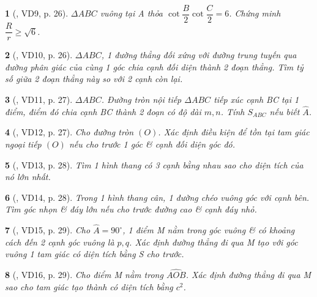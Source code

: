 \documentclass{article}
\newtheorem{baitoan}{}
\begin{document}
\begin{baitoan}[\cite{Hai_Hung_Thu_Tung2022_tap_1}, VD9, p. 26]
	$\Delta ABC$ vuông tại A thỏa $\cot\dfrac{B}{2}\cot\dfrac{C}{2} = 6$. Chứng minh $\dfrac{R}{r}\ge\sqrt{6}$.
\end{baitoan}

\begin{baitoan}[\cite{Hai_Hung_Thu_Tung2022_tap_1}, VD10, p. 26]
	$\Delta ABC$, 1 đường thẳng đối xứng với đường trung tuyến qua đường phân giác của cùng 1 góc chia cạnh đối diện thành 2 đoạn thẳng. Tìm tỷ số giữa 2 đoạn thẳng này so với 2 cạnh còn lại.
\end{baitoan}

\begin{baitoan}[\cite{Hai_Hung_Thu_Tung2022_tap_1}, VD11, p. 27]
	$\Delta ABC$. Đường tròn nội tiếp $\Delta ABC$ tiếp xúc cạnh BC tại 1 điểm, điểm đó chia cạnh BC thành 2 đoạn có độ dài $m,n$. Tính $S_{ABC}$ nếu biết $\widehat{A}$.
\end{baitoan}

\begin{baitoan}[\cite{Hai_Hung_Thu_Tung2022_tap_1}, VD12, p. 27]
	Cho đường tròn $(O)$. Xác định điều kiện để tồn tại tam giác ngoại tiếp $(O)$ nếu cho trước 1 góc \& cạnh đối diện góc đó.
\end{baitoan}

\begin{baitoan}[\cite{Hai_Hung_Thu_Tung2022_tap_1}, VD13, p. 28]
	Tìm 1 hình thang có 3 cạnh bằng nhau sao cho diện tích của nó lớn nhất.
\end{baitoan}

\begin{baitoan}[\cite{Hai_Hung_Thu_Tung2022_tap_1}, VD14, p. 28]
	Trong 1 hình thang cân, 1 đường chéo vuông góc với cạnh bên. Tìm góc nhọn \& đáy lớn nếu cho trước đường cao \& cạnh đáy nhỏ.
\end{baitoan}

\begin{baitoan}[\cite{Hai_Hung_Thu_Tung2022_tap_1}, VD15, p. 29]
	Cho $\widehat{A} = 90^\circ$, 1 điểm M nằm trong góc vuông \& có khoảng cách đến 2 cạnh góc vuông là $p,q$. Xác định đường thẳng đi qua M tạo với góc vuông 1 tam giác có diện tích bằng S cho trước.
\end{baitoan}

\begin{baitoan}[\cite{Hai_Hung_Thu_Tung2022_tap_1}, VD16, p. 29]
	Cho điểm M nằm trong $\widehat{AOB}$. Xác định đường thẳng đi qua M sao cho tam giác tạo thành có diện tích bằng $c^2$.
\end{baitoan}
\end{document}
